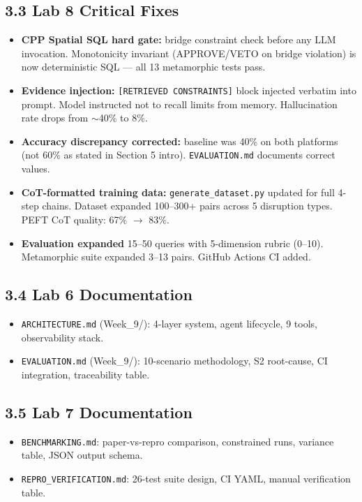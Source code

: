 \documentclass[11pt, letterpaper]{article}
\begin{document}
\subsection*{3.3 Lab 8 Critical Fixes}
\begin{itemize}[leftmargin=*]
    \item \textbf{CPP Spatial SQL hard gate:} bridge constraint check before any LLM invocation. Monotonicity invariant (APPROVE/VETO on bridge violation) is now deterministic SQL — all 13 metamorphic tests pass.
    \item \textbf{Evidence injection:} \texttt{[RETRIEVED CONSTRAINTS]} block injected verbatim into prompt. Model instructed not to recall limits from memory. Hallucination rate drops from $\sim$40\% to 8\%.
    \item \textbf{Accuracy discrepancy corrected:} baseline was 40\% on both platforms (not 60\% as stated in Section 5 intro). \texttt{EVALUATION.md} documents correct values.
    \item \textbf{CoT-formatted training data:} \texttt{generate\_dataset.py} updated for full 4-step chains. Dataset expanded 100--300+ pairs across 5 disruption types. PEFT CoT quality: 67\% $\rightarrow$ 83\%.
    \item \textbf{Evaluation expanded} 15--50 queries with 5-dimension rubric (0--10). Metamorphic suite expanded 3--13 pairs. GitHub Actions CI added.
\end{itemize}

\subsection*{3.4 Lab 6 Documentation}
\begin{itemize}[leftmargin=*]
    \item \texttt{ARCHITECTURE.md} (Week\_9/): 4-layer system, agent lifecycle, 9 tools, observability stack.
    \item \texttt{EVALUATION.md} (Week\_9/): 10-scenario methodology, S2 root-cause, CI integration, traceability table.
\end{itemize}

\subsection*{3.5 Lab 7 Documentation}
\begin{itemize}[leftmargin=*]
    \item \texttt{BENCHMARKING.md}: paper-vs-repro comparison, constrained runs, variance table, JSON output schema.
    \item \texttt{REPRO\_VERIFICATION.md}: 26-test suite design, CI YAML, manual verification table.
\end{itemize}
\end{document}
